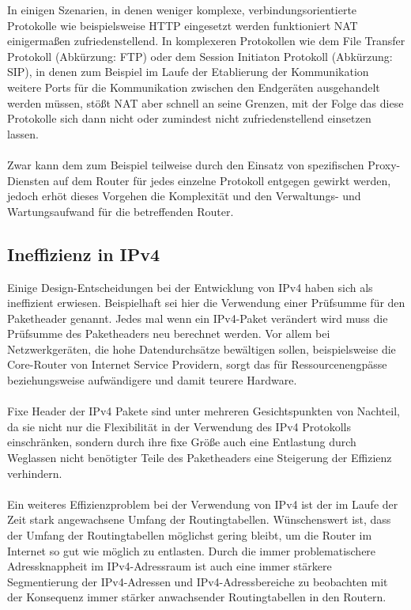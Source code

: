 \documentclass[a4paper,12pt]{scrartcl}
\begin{document}
In einigen Szenarien, in denen weniger komplexe, verbindungsorientierte Protokolle wie beispielsweise HTTP eingesetzt werden funktioniert NAT einigerma\ss{}en zufriedenstellend. In komplexeren Protokollen wie dem File Transfer Protokoll (Abk\"urzung: FTP) oder dem Session Initiaton Protokoll (Abk\"urzung: SIP), in denen zum Beispiel im Laufe der Etablierung der Kommunikation weitere Ports f\"ur die Kommunikation zwischen den Endger\"aten ausgehandelt werden m\"ussen, st\"o{\ss}t NAT aber schnell an seine Grenzen, mit der Folge das diese Protokolle sich dann nicht oder zumindest nicht zufriedenstellend einsetzen lassen.\\
\\
Zwar kann dem zum Beispiel teilweise durch den Einsatz von spezifischen Proxy-Diensten auf dem Router f\"ur jedes einzelne Protokoll entgegen gewirkt werden, jedoch erh\"ot dieses Vorgehen die Komplexit\"at und den Verwaltungs- und Wartungsaufwand f\"ur die betreffenden Router.

\subsection{Ineffizienz in IPv4}
Einige Design-Entscheidungen bei der Entwicklung von IPv4 haben sich als ineffizient erwiesen. Beispielhaft sei hier die Verwendung einer Prüfsumme für den Paketheader genannt. Jedes mal wenn ein IPv4-Paket verändert wird muss die Prüfsumme des Paketheaders neu berechnet werden. Vor allem bei Netzwerkgeräten, die hohe Datendurchsätze bewältigen sollen, beispielsweise die Core-Router von Internet Service Providern, sorgt das für Ressourcenengpässe beziehungsweise aufwändigere und damit teurere Hardware.\\
\\
Fixe Header der IPv4 Pakete sind unter mehreren Gesichtspunkten von Nachteil, da sie nicht nur die Flexibilität in der Verwendung des IPv4 Protokolls einschränken, sondern durch ihre fixe Größe auch eine Entlastung durch Weglassen nicht benötigter Teile des Paketheaders eine Steigerung der Effizienz verhindern.  \\
\\
Ein weiteres Effizienzproblem bei der Verwendung von IPv4 ist der im Laufe der Zeit stark angewachsene Umfang der Routingtabellen. Wünschenswert ist, dass der Umfang der Routingtabellen möglichst gering bleibt, um die Router im Internet so gut wie möglich zu entlasten. Durch die immer problematischere Adressknappheit im IPv4-Adressraum ist auch eine immer stärkere Segmentierung der IPv4-Adressen und IPv4-Adressbereiche zu beobachten mit der Konsequenz immer stärker anwachsender Routingtabellen in den Routern.\\
\end{document}
